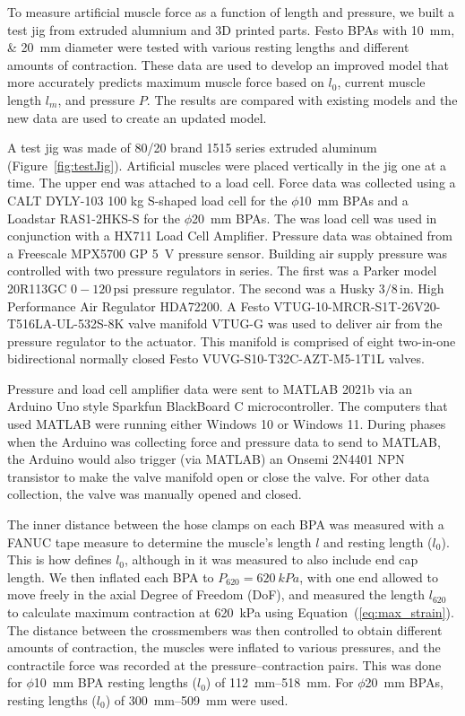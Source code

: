 To measure artificial muscle force as a function of length and pressure, we built a test jig from extruded alumnium and 3D printed parts. Festo BPAs with \qtylist{10;20}{\mm} diameter were tested with various resting lengths and different amounts of contraction. These data are used to develop an improved model that more accurately predicts maximum muscle force based on $l_0$, current muscle length $l_{m}$, and pressure $P$. The results are compared with existing models and the new data are used to create an updated model. 

A test jig was made of 80/20 brand 1515 series extruded aluminum (Figure~\ref{fig:testJig}). Artificial muscles were placed vertically in the jig one at a time. The upper end was attached to a load cell.
Force data was collected using a CALT DYLY-103 100 kg S-shaped load cell for the $\phi$\qty{10}{\mm} BPAs and a Loadstar RAS1-2HKS-S for the $\phi$\qty{20}{\mm} BPAs. The was load cell was used in conjunction with a HX711 Load Cell Amplifier. Pressure data was obtained from a Freescale MPX5700 GP \qty{5}{\volt} pressure sensor. Building air supply pressure was controlled with two pressure regulators in series. The first was a Parker model 20R113GC $0-120\,\text{psi}$ pressure regulator. The second was a Husky $3/8\,\text{in.}$ High Performance Air Regulator HDA72200. A Festo VTUG-10-MRCR-S1T-26V20-T516LA-UL-532S-8K valve manifold VTUG-G was used to deliver air from the pressure regulator to the actuator. This manifold is comprised of eight two-in-one bidirectional normally closed Festo VUVG-S10-T32C-AZT-M5-1T1L valves. 

Pressure and load cell amplifier data were sent to MATLAB 2021b via an Arduino Uno style Sparkfun BlackBoard C microcontroller. The computers that used MATLAB were running either Windows 10 or Windows 11. During phases when the Arduino was collecting force and pressure data to send to MATLAB, the Arduino would also trigger (via MATLAB) an Onsemi 2N4401 NPN transistor to make the valve manifold open or close the valve. For other data collection, the valve was manually opened and closed. 

The inner distance between the hose clamps on each BPA was measured with a FANUC tape measure to determine the muscle's length $l$ and resting length ($l_0$). This is how \citet{festo_2026} defines $l_0$, although in \citet{hunt_modeling_2017} it was measured to also include end cap length. We then inflated each BPA to $P_{620}=\qty{620}{kPa}$, with one end allowed to move freely in the axial Degree of Freedom (DoF), and measured the length $l_{620}$ to calculate maximum contraction at \qty{620}{\kPa} using Equation~(\ref{eq:max_strain}). The distance between the crossmembers was then controlled to obtain different amounts of contraction, the muscles were inflated to various pressures, and the contractile force was recorded at the pressure--contraction pairs. This was done for $\phi$\qty{10}{\mm} BPA resting lengths ($l_0$) of \SIrange[range-phrase=--]{112}{518}{\mm}. For $\phi$\qty{20}{\mm} BPAs, resting lengths ($l_0$) of \SIrange[range-phrase=--]{300}{509}{\mm} were used.

